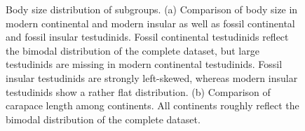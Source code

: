 \begin{center}
	\begin{figure}[H]
		\caption[Comparison of carapace lengths in subgroups]{Body size distribution of subgroups. (a) Comparison of body size in modern continental and modern insular as well as fossil continental and fossil insular testudinids. Fossil continental testudinids reflect the bimodal distribution of the complete dataset, but large testudinids are missing in modern continental testudinids. Fossil insular testudinids are strongly left-skewed, whereas modern insular testudinids show a rather flat distribution. (b) Comparison of carapace length among continents. All continents roughly reflect the bimodal distribution of the complete dataset.}
		\label{fig:HistRest}
	\end{figure}
\end{center}
